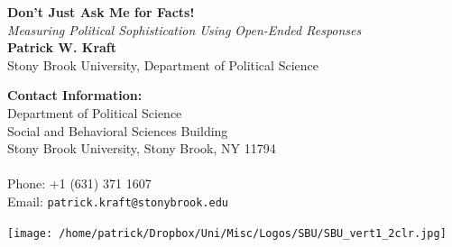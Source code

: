 \documentclass[a0,landscape]{a0poster}
\begin{document}


\begin{minipage}[b]{0.55\linewidth}
\veryHuge \color{NavyBlue} \textbf{Don't Just Ask Me for Facts!} \color{Black}\\ %
\Huge\textit{Measuring Political Sophistication Using Open-Ended Responses}\\[1cm] %
\huge \textbf{Patrick W. Kraft}\\ %
\huge Stony Brook University, Department of Political Science\\ %
\end{minipage}
%
\begin{minipage}[b]{0.25\linewidth}
\color{DarkSlateGray}\Large \textbf{Contact Information:}\\
Department of Political Science\\ %
Social and Behavioral Sciences Building\\
Stony Brook University, Stony Brook, NY 11794\\\\
Phone: +1 (631) 371 1607\\ %
Email: \texttt{patrick.kraft@stonybrook.edu}\\ %
\end{minipage}
%
\begin{minipage}[b]{0.19\linewidth}
\hspace{5cm}\texttt{[image: /home/patrick/Dropbox/Uni/Misc/Logos/SBU/SBU\_vert1\_2clr.jpg]}\\\\
\end{minipage}

\vspace{1cm} %

\end{document}

